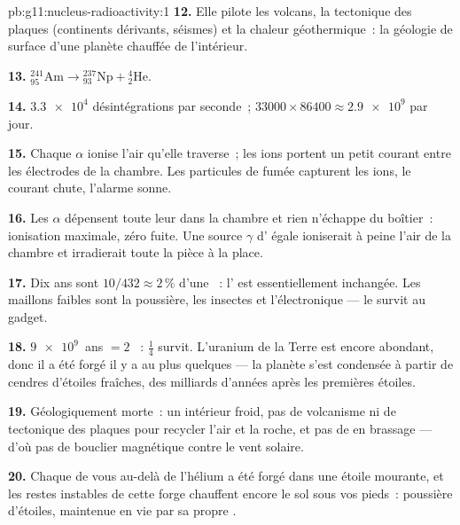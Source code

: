 \begin{solution}{pb:g11:nucleus-radioactivity:1}
\textbf{12.} Elle pilote les volcans, la tectonique des plaques
(continents dérivants, séismes) et la chaleur géothermique~: la
géologie de surface d'une planète chauffée de l'intérieur.

\textbf{13.} ${}^{241}_{95}\mathrm{Am} \to {}^{237}_{93}\mathrm{Np} +
{}^{4}_{2}\mathrm{He}$.

\textbf{14.} $\num{3.3e4}$ désintégrations par seconde~;
$\num{33000} \times 86400 \approx \num{2.9e9}$ par jour.

\textbf{15.} Chaque $\alpha$ ionise l'air qu'elle traverse~; les ions
portent un petit courant entre les électrodes de la chambre. Les
particules de fumée capturent les ions, le courant chute, l'alarme
sonne.

\textbf{16.} Les $\alpha$ dépensent toute leur
 dans la chambre et rien
n'échappe du boîtier~: ionisation maximale, zéro fuite. Une source
$\gamma$ d' égale ioniserait à
peine l'air de la chambre et irradierait toute la pièce à la place.

\textbf{17.} Dix ans sont $10/432 \approx 2\,\%$ d'une
~: l'
 est essentiellement
inchangée. Les maillons faibles sont la poussière, les insectes et
l'électronique --- le
 survit au gadget.

\textbf{18.} $\num{9e9}$~ans $= 2$ ~: $\frac14$ survit.
L'uranium de la Terre est encore abondant, donc il a été forgé il y a
au plus quelques  --- la planète s'est condensée à partir de
cendres d'étoiles fraîches, des milliards d'années après les premières
étoiles.

\textbf{19.} Géologiquement morte~: un intérieur froid, pas de
volcanisme ni de tectonique des plaques pour recycler l'air et la
roche, et pas de  en brassage --- d'où pas de bouclier magnétique
contre le vent solaire.

\textbf{20.} Chaque  de vous
au-delà de l'hélium a été forgé dans une étoile mourante, et les
restes instables de cette forge chauffent encore le sol sous vos
pieds~: poussière d'étoiles, maintenue en vie par sa propre
.
\end{solution}
